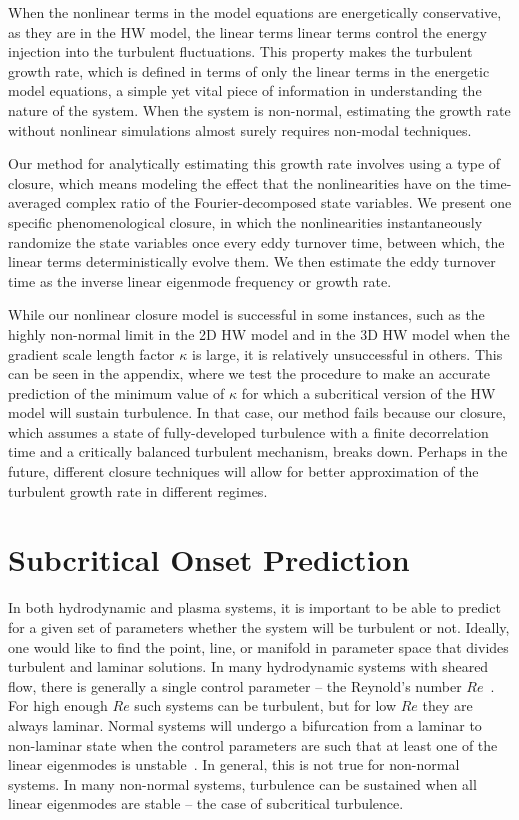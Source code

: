 \documentclass[twocolumn,showkeys,superscriptaddress]{revtex4}
\begin{document}
When the nonlinear terms in the model equations are energetically conservative, as they are in the HW model, 
the linear terms linear terms control the energy injection into the turbulent fluctuations.
This property makes the turbulent growth rate, which is defined in terms of only the linear terms in the energetic model equations, a simple yet vital piece of information
in understanding the nature of the system. When the system is non-normal, estimating the growth rate without nonlinear simulations almost surely requires non-modal techniques.

Our method for analytically estimating this growth rate involves using a type of closure, which means modeling the effect that the nonlinearities have
on the time-averaged complex ratio of the Fourier-decomposed state variables. 
We present one specific phenomenological closure, in which the nonlinearities instantaneously randomize the state variables once every eddy turnover time, between
which, the linear terms deterministically evolve them. We then estimate the eddy turnover time as the inverse linear eigenmode frequency or growth rate.

While our nonlinear closure model is successful in some instances, such as the highly non-normal limit in the 2D HW model and in the 3D HW model when the gradient scale length factor $\kappa$ is large,
it is relatively unsuccessful in others. This can be seen in the appendix, where we test the procedure to make an accurate prediction of the minimum value of $\kappa$ for which a subcritical version
of the HW model will sustain turbulence. In that case, our method fails because our closure, which assumes a state of fully-developed turbulence with a finite decorrelation time and a critically
balanced turbulent mechanism, breaks down.
Perhaps in the future, different closure techniques will allow for better approximation of the turbulent growth rate in different regimes.


\appendix
\section{Subcritical Onset Prediction}

In both hydrodynamic and plasma systems, it is important to be able to predict for a given set of parameters whether the system will be turbulent or not.
Ideally, one would like to find the point, line, or manifold in parameter space that divides turbulent and laminar solutions.
In many hydrodynamic systems with sheared flow, there is generally a single control parameter -- the Reynold's number $Re$~\cite{drazin1981}. For high enough $Re$ such systems
can be turbulent, but for low $Re$ they are always laminar.
Normal systems will undergo a bifurcation from a laminar to non-laminar state when the control parameters are such that at least one of the linear eigenmodes is unstable~\cite{grossmann2000}.
In general, this is not true for non-normal systems. In many non-normal systems, turbulence can be sustained when all linear eigenmodes are stable -- the case of subcritical turbulence. 
\end{document}
